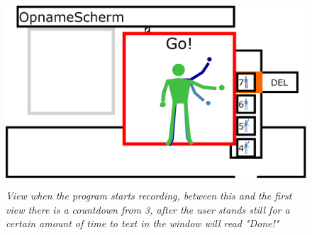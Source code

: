 \begin{figure}[H]
	\begin{center}
		\includegraphics[width=12.5cm, height=7cm]{figures/6_record_start.png}
		\caption{\emph{View when the program starts recording, between this and the first view there is a countdown from 3, after the user stands still for a certain amount of time to text in the window will read "Done!"}}
		\label{last recording screen}
	\end{center}
\end{figure}

